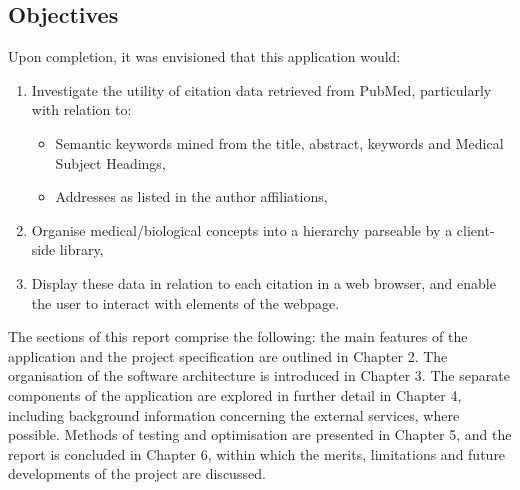 \documentclass[Report.tex]{subfiles}
\begin{document}
\subsection{Objectives}
Upon completion, it was envisioned that this application would:

\begin{enumerate}
\item Investigate the utility of citation data retrieved from PubMed, particularly with relation to:
	\begin{itemize}
	\item Semantic keywords mined from the title, abstract, keywords and Medical Subject Headings,
	\item Addresses as listed in the author affiliations,
	\end{itemize}
\item Organise medical/biological concepts into a hierarchy parseable by a client-side library,
\item Display these data in relation to each citation in a web browser, and enable the user to interact with elements of the webpage.
\end{enumerate}

The sections of this report comprise the following: the main features of the application and the project specification are outlined in Chapter 2. The organisation of the software architecture is introduced in Chapter 3. The separate components of the application are explored in further detail in Chapter 4, including background information concerning the external services, where possible. Methods of testing and optimisation are presented in Chapter 5, and the report is concluded in Chapter 6, within which the merits, limitations and future developments of the project are discussed.
\end{document}
